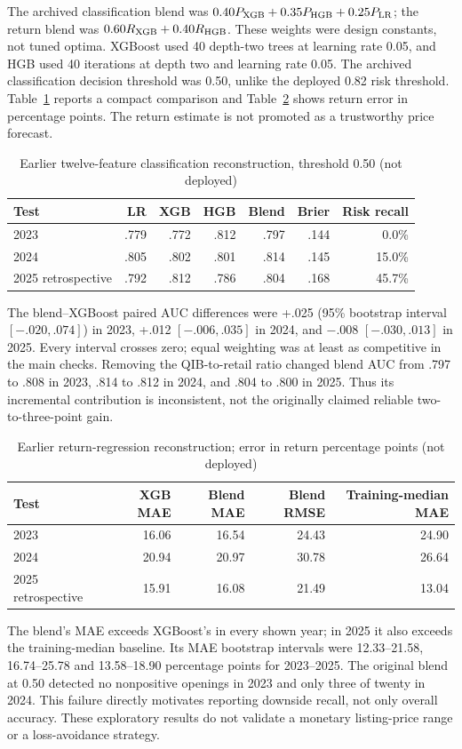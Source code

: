 \documentclass[runningheads]{llncs}
\begin{document}
The archived classification blend was $0.40P_{\rm XGB}+0.35P_{\rm HGB}+0.25P_{\rm LR}$; the return blend was $0.60R_{\rm XGB}+0.40R_{\rm HGB}$. These weights were design constants, not tuned optima. XGBoost used 40 depth-two trees at learning rate 0.05, and HGB used 40 iterations at depth two and learning rate 0.05. The archived classification decision threshold was 0.50, unlike the deployed 0.82 risk threshold. Table~\ref{tab:legacy-class} reports a compact comparison and Table~\ref{tab:legacy-return} shows return error in percentage points. The return estimate is not promoted as a trustworthy price forecast.
\begin{table}[tb]
\caption{Earlier twelve-feature classification reconstruction, threshold 0.50 (not deployed)}\label{tab:legacy-class}
\centering\small
\begin{tabular}{@{}lrrrrrr@{}}\toprule
Test & LR & XGB & HGB & Blend & Brier & Risk recall\\\midrule
2023 & .779 & .772 & .812 & .797 & .144 & 0.0\%\\
2024 & .805 & .802 & .801 & .814 & .145 & 15.0\%\\
2025 retrospective & .792 & .812 & .786 & .804 & .168 & 45.7\%\\\bottomrule
\end{tabular}
\end{table}
The blend--XGBoost paired AUC differences were +.025 (95\% bootstrap interval $[-.020,.074]$) in 2023, +.012 $[-.006,.035]$ in 2024, and $-.008$ $[-.030,.013]$ in 2025. Every interval crosses zero; equal weighting was at least as competitive in the main checks. Removing the QIB-to-retail ratio changed blend AUC from .797 to .808 in 2023, .814 to .812 in 2024, and .804 to .800 in 2025. Thus its incremental contribution is inconsistent, not the originally claimed reliable two-to-three-point gain.
\begin{table}[tb]
\caption{Earlier return-regression reconstruction; error in return percentage points (not deployed)}\label{tab:legacy-return}
\centering\small
\begin{tabular}{@{}lrrrr@{}}\toprule
Test & XGB MAE & Blend MAE & Blend RMSE & Training-median MAE\\\midrule
2023 & 16.06 & 16.54 & 24.43 & 24.90\\
2024 & 20.94 & 20.97 & 30.78 & 26.64\\
2025 retrospective & 15.91 & 16.08 & 21.49 & 13.04\\\bottomrule
\end{tabular}
\end{table}
The blend's MAE exceeds XGBoost's in every shown year; in 2025 it also exceeds the training-median baseline. Its MAE bootstrap intervals were 12.33--21.58, 16.74--25.78 and 13.58--18.90 percentage points for 2023--2025. The original blend at 0.50 detected no nonpositive openings in 2023 and only three of twenty in 2024. This failure directly motivates reporting downside recall, not only overall accuracy. These exploratory results do not validate a monetary listing-price range or a loss-avoidance strategy.
\end{document}
